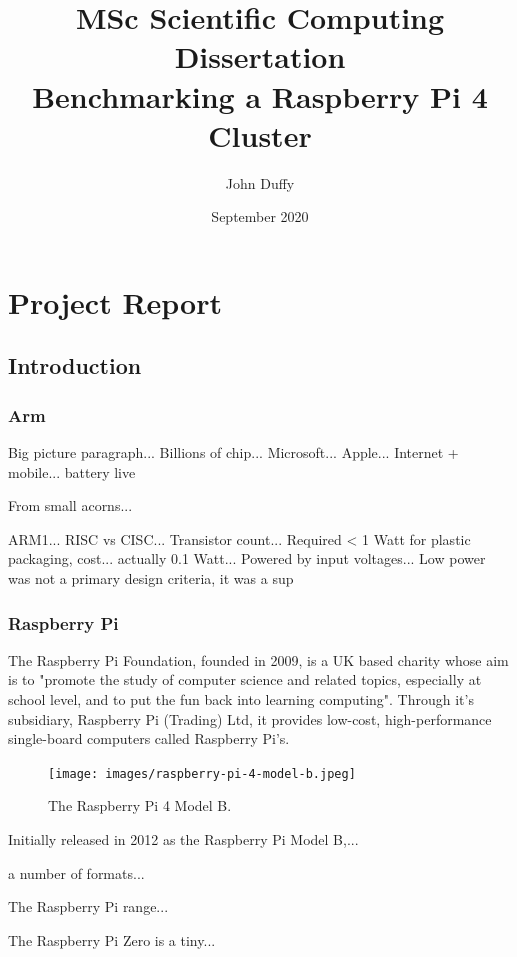 \documentclass{report}
\title{MSc Scientific Computing Dissertation\\Benchmarking a Raspberry Pi 4 Cluster}
\author{John Duffy}
\date{September 2020}
\begin{document}
\maketitle

\tableofcontents


%
%
\part{Project Report}


%
%
\chapter{Introduction}


%
%
\section{Arm}

Big picture paragraph...
Billions of chip... 
Microsoft...
Apple...
Internet + mobile... battery live

From small acorns...

ARM1...
RISC vs CISC...
Transistor count...
Required < 1 Watt for plastic packaging, cost... actually 0.1 Watt...
Powered by input voltages...
Low power was not a primary design criteria, it was a sup 


%
%
\section{Raspberry Pi}

The Raspberry Pi Foundation, founded in 2009, is a UK based charity whose aim is to "promote the study of computer science and related topics, especially at school level, and to put the fun back into learning computing". Through it's subsidiary, Raspberry Pi (Trading) Ltd, it provides low-cost, high-performance single-board computers called Raspberry Pi's.

\begin{figure}
	\centering	
	\texttt{[image: images/raspberry-pi-4-model-b.jpeg]}
	\caption{The Raspberry Pi 4 Model B.}
\end{figure}

Initially released in 2012 as the Raspberry Pi Model B,...

a number of formats...


The Raspberry Pi range...

The Raspberry Pi Zero is a tiny...
\end{document}
